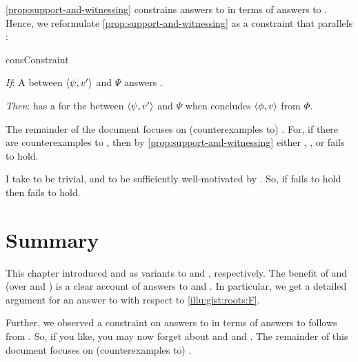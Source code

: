 


\begin{note}
  \autoref{prop:support-and-witnessing} constrains answers to \qWhyV{} in terms of answers to \qHowV{}.
  Hence, we reformulate \autoref{prop:support-and-witnessing} as a constraint that parallels \issueInclusion{}:

  \begin{constraint}{consConstraint}{\issueConstraint{}}
    \vspace{-\baselineskip}
    \begin{itenum}
    \item[\emph{If}:]
      A \ros{} between \(\langle\psi, v'\rangle\) and \(\Psi\) answers \qWhyV{}.
    \item[\emph{Then}:]
      \vAgent{} has a \wit{} for the \ros{} between \(\langle\psi, v'\rangle\) and \(\Psi\) when \vAgent{} concludes \(\langle\phi, v\rangle\) from \(\Phi\).
    \end{itenum}
    \vspace{-\baselineskip}
  \end{constraint}

  \noindent%
  The remainder of the document focuses on (counterexamples to) \issueConstraint{}.
  For, if there are counterexamples to \issueConstraint{}, then by \autoref{prop:support-and-witnessing} either \linkW{}, \linkH{}, or \issueInclusion{} fails to hold.

  I take \linkH{} to be trivial, and \linkW{} to be sufficiently well-motivated by \progEx{}.
  So, if \issueConstraint{} fails to hold then \issueInclusion{} fails to hold.
\end{note}



\section*{Summary}

\begin{note}
  This chapter introduced \qWhyV{} and \qHowV{} as variants to \qWhy{} and \qHow{}, respectively.
  The benefit of \qWhyV{} and \qHowV{} (over \qWhy{} and \qHow{}) is a clear account of answers to \qWhyV{} and \qHowV{}.
  In particular, we get a detailed argument for an answer to \qWhyV{} with respect to \autoref{illu:gist:roots:F}.

  Further, we observed a constraint on answers to \qWhyV{} in terms of answers to \qHowV{} follows from \issueInclusion{}.
  So, if you like, you may now forget about \qWhy{} and \qHow{} and \issueInclusion{}.
  The remainder of this document focuses on (counterexamples to) \issueConstraint{}.
\end{note}


